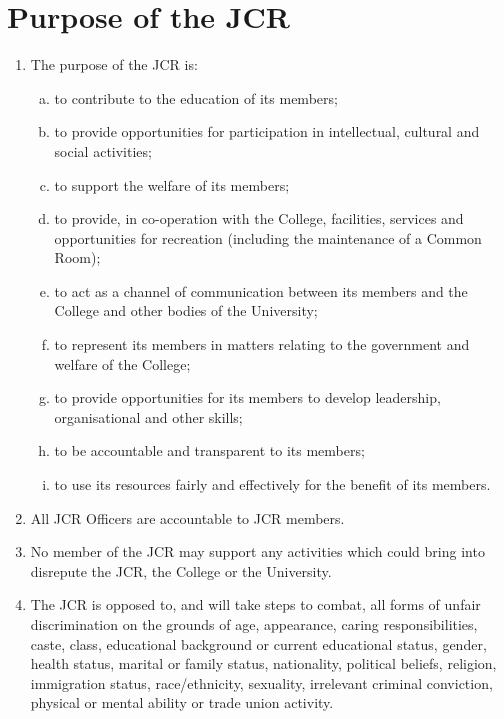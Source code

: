 \documentclass[12pt]{article}
\begin{document}
\section{Purpose of the JCR}
\begin{enumerate}
    \item The purpose of the JCR is:
    \begin{enumerate}[(a)]
        \item to contribute to the education of its members;
        \item to provide opportunities for participation in intellectual, cultural and social activities;
        \item to support the welfare of its members;
        \item to provide, in co-operation with the College, facilities, services and opportunities for recreation (including the maintenance of a Common Room);
        \item to act as a channel of communication between its members and the College and other bodies of the University;
        \item to represent its members in matters relating to the government and welfare of the College;
        \item to provide opportunities for its members to develop leadership, organisational and other skills;
        \item to be accountable and transparent to its members;
        \item to use its resources fairly and effectively for the benefit of its members.
    \end{enumerate}
    \item All JCR Officers are accountable to JCR members.
    \item No member of the JCR may support any activities which could bring into disrepute the JCR, the College or the University.
    \item The JCR is opposed to, and will take steps to combat, all forms of unfair discrimination on the grounds of age, appearance, caring responsibilities, caste, class, educational background or current educational status, gender, health status, marital or family status, nationality, political beliefs, religion, immigration status, race/ethnicity, sexuality, irrelevant criminal conviction, physical or mental ability or trade union activity.
\end{enumerate}
\newpage
\end{document}
